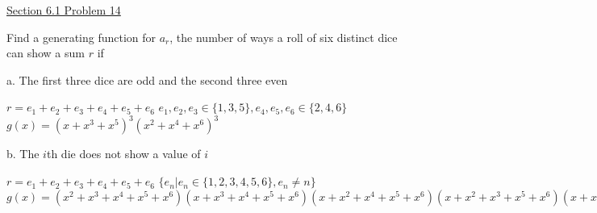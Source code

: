 \documentclass{article}
\begin{document}
\underline{Section 6.1 Problem 14}

Find a generating function for $a_r$, the number of ways a roll of six distinct dice can show a sum $r$ if\newline{}

a. The first three dice are odd and the second three even\newline{}

$r=e_1+e_2+e_3+e_4+e_5+e_6$\newline{}
$e_1, e_2, e_3 \in \{1,3,5\}, e_4, e_5, e_6 \in \{2,4,6\}$\newline{}
$g(x)=(x+x^3+x^5)^3(x^2+x^4+x^6)^3$\newline{}

b. The $i$th die does not show a value of $i$

$r=e_1+e_2+e_3+e_4+e_5+e_6$\newline{}
$\{e_n|e_n\in \{1,2,3,4,5,6\}, e_n\neq n\}$\newline{}
$g(x)=(x^2+x^3+x^4+x^5+x^6)(x+x^3+x^4+x^5+x^6)(x+x^2+x^4+x^5+x^6)(x+x^2+x^3+x^5+x^6)(x+x^2+x^3+x^4+x^6)(x+x^2+x^3+x^4+x^5)$\newline{}
\end{document}
